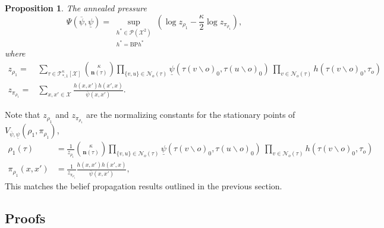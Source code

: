 \documentclass[12pt]{article}
\newtheorem{proposition}[theorem]{Proposition}
\newcommand{\BS}{\backslash}
\newcommand{\X}{{\mathcal{X}}}
\newcommand{\PP}{{\mathcal{P}}}
\newcommand{\TT}{{\mathcal{T}}}
\newcommand{\PO}{{\overline{\psi}}}
\newcommand{\PU}{{\underline{\psi}}}
\newcommand{\CF}{{h}}
\newcommand{\CFo}{{h^*}}
\newcommand{\AP}{{\Psi}}
\newcommand{\tree}[2]{\TT_{*, #1}^{#2}[\X]}
\newcommand{\CNT}{{\mathbf{n}}}
\newcommand{\BP}{{\text{BP}}}
\newcommand{\Ss}{{\rho_1}}
\newcommand{\Es}{{\pi_\Ss}}
\newcommand{\NB}[1]{{\mathcal{N}_o(#1)}}
\numberwithin{equation}{section}
\begin{document}
\begin{proposition}\label{Prp.NNNI-CF}
    The annealed pressure
    \begin{equation}
        \AP(\PO, \PU) = \sup_{\substack{h^*\in\PP(\X^2)\\ \CFo = \BP\CFo}} \left(\log z_\Ss - \frac\kappa2 \log z_\Es\right),
    \end{equation}
    where
    \begin{align}
        z_\Ss = & \sum_{\tau\in\tree{1}{\kappa}}{\kappa\choose\CNT(\tau)}\prod_{\{v, u\}\in\NB{\tau}}\PU(\tau(v\BS o)_0, \tau(u\BS o)_0)\ \prod_{v\in\NB{\tau}}h(\tau(v\BS o)_0, \tau_o) \\
        z_\Es=  & \sum_{x, x'\in\X}\frac{\CF(x, x')\CF(x', x)}{\PO(x, x')}.
    \end{align}
\end{proposition}
Note that $z_\Ss$ and $z_\Es$ are the normalizing constants for the stationary points of $V_{\PO, \PU}(\Ss, \Es)$,
\begin{align}
    \Ss(\tau)  & = \frac{1}{z_\Ss}{\kappa\choose\CNT(\tau)}\prod_{\{v, u\}\in\NB{\tau}}\PU(\tau(v\BS o)_0, \tau(u\BS o)_0)\ \prod_{v\in\NB{\tau}}h(\tau(v\BS o)_0, \tau_o) \\
    \Es(x, x') & = \frac{1}{z_\Es}\frac{\CF(x, x')\CF(x', x)}{\PO(x, x')},
\end{align}
This matches the belief propagation results outlined in the previous section.

\newpage

\subsection{Proofs}
\end{document}
